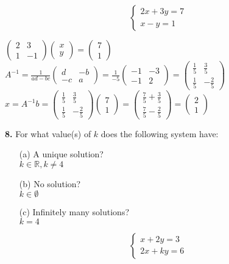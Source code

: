 \documentclass[12pt]{article}
\begin{document}
$$\begin{cases}
2x + 3y = 7 \\
x - y = 1
\end{cases}$$
\begin{minipage}[t][4cm][t]{\linewidth}
    $\displaystyle
      \begin{pmatrix} 2 & 3 \\ 1 & -1 \end{pmatrix}
      \begin{pmatrix} x \\ y \end{pmatrix}
      = \begin{pmatrix} 7 \\ 1 \end{pmatrix}$
    \\[8pt] $A^{-1} = \frac{1}{ad-bc} \begin{pmatrix} d & -b \\ -c & a \end{pmatrix} = \frac{1}{-5} \begin{pmatrix} -1 & -3 \\ -1 & 2 \end{pmatrix} = \begin{pmatrix} \frac{1}{5} & \frac{3}{5} \\ \frac{1}{5} & -\frac{2}{5} \end{pmatrix}$
    \\[8pt] $x=A^{-1}b = \begin{pmatrix} \frac{1}{5} & \frac{3}{5} \\ \frac{1}{5} & -\frac{2}{5} \end{pmatrix} \begin{pmatrix} 7 \\ 1 \end{pmatrix} = \begin{pmatrix} \frac{7}{5}+\frac{3}{5} \\ \frac{7}{5}-\frac{2}{5} \end{pmatrix} = \begin{pmatrix} 2 \\ 1 \end{pmatrix}$
\end{minipage}

\newpage

\textbf{8.} For what value(s) of $k$ does the following system have:
\begin{enumerate}
\item[(a)] A unique solution?
\\$k \in \mathbb{R}, k \neq 4$
\item[(b)] No solution?
\\$k \in \emptyset$
\item[(c)] Infinitely many solutions?
\\$k = 4$
\end{enumerate}

$$\begin{cases}
x + 2y = 3 \\
2x + ky = 6
\end{cases}$$
\vspace{4cm}
\end{document}
